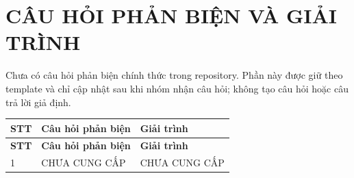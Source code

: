 \chapter{CÂU HỎI PHẢN BIỆN VÀ GIẢI TRÌNH}
\label{app:review-response}

Chưa có câu hỏi phản biện chính thức trong repository. Phần này được giữ theo
template và chỉ cập nhật sau khi nhóm nhận câu hỏi; không tạo câu hỏi hoặc câu
trả lời giả định.

\begin{longtable}{>{\raggedright\arraybackslash}p{}
>{\raggedright\arraybackslash}p{}
>{\raggedright\arraybackslash}p{}}
\toprule
\textbf{STT} & \textbf{Câu hỏi phản biện} & \textbf{Giải trình} \\
\midrule
\endfirsthead
\toprule
\textbf{STT} & \textbf{Câu hỏi phản biện} & \textbf{Giải trình} \\
\midrule
\endhead
1 & CHƯA CUNG CẤP & CHƯA CUNG CẤP \\
\bottomrule
\end{longtable}
